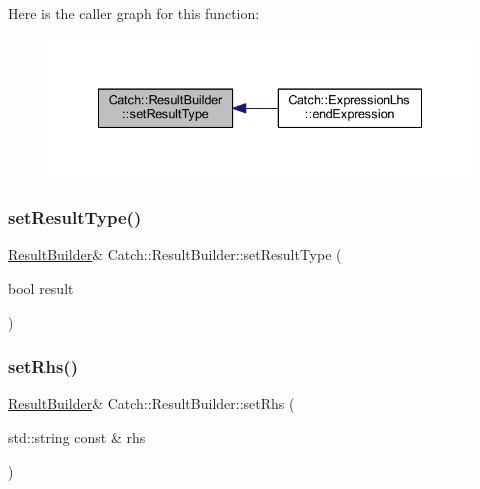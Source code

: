 Here is the caller graph for this function\+:\nopagebreak
\begin{figure}[H]
\begin{center}
\leavevmode
\includegraphics[width=335pt]{class_catch_1_1_result_builder_af896e372db9d7fc90ddeceff3ad110d0_icgraph}
\end{center}
\end{figure}
\hypertarget{class_catch_1_1_result_builder_ae504348b073d0360bfd5fc33347ec689}{}\label{class_catch_1_1_result_builder_ae504348b073d0360bfd5fc33347ec689} 
\subsubsection{\texorpdfstring{set\+Result\+Type()}{setResultType()}\hspace{0.1cm}{\footnotesize\ttfamily [2/2]}}
{\footnotesize\ttfamily \hyperlink{class_catch_1_1_result_builder}{Result\+Builder}\& Catch\+::\+Result\+Builder\+::set\+Result\+Type (\begin{DoxyParamCaption}\item[{bool}]{result }\end{DoxyParamCaption})}

\hypertarget{class_catch_1_1_result_builder_aaeb41a00cf352c7a0bcf75a0ded0a4a2}{}\label{class_catch_1_1_result_builder_aaeb41a00cf352c7a0bcf75a0ded0a4a2} 
\subsubsection{\texorpdfstring{set\+Rhs()}{setRhs()}}
{\footnotesize\ttfamily \hyperlink{class_catch_1_1_result_builder}{Result\+Builder}\& Catch\+::\+Result\+Builder\+::set\+Rhs (\begin{DoxyParamCaption}\item[{std\+::string const \&}]{rhs }\end{DoxyParamCaption})}

